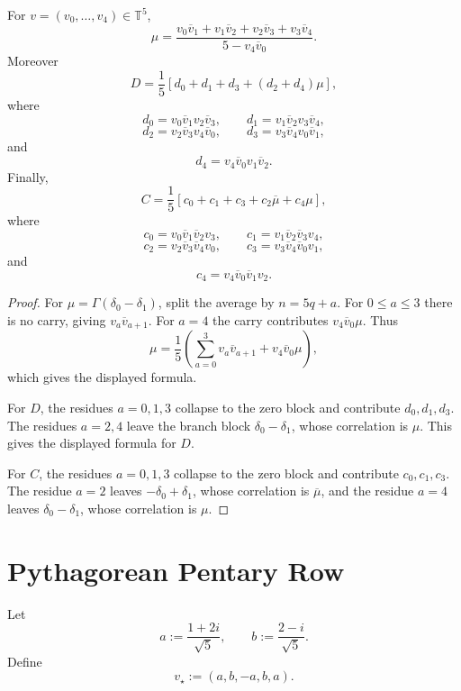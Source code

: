 \begin{theorem}[Pentary anchored $L=2$ formulas]
\label{thm:innovation-input-pentary-ltwo-formulas}
For $v=(v_0,\ldots,v_4)\in\mathbb T^5$,
$$
\mu
=
\frac{
v_0\overline v_1+
v_1\overline v_2+
v_2\overline v_3+
v_3\overline v_4
}{
5-v_4\overline v_0
}.
$$
Moreover
$$
D
=
\frac15
\left[
d_0+d_1+d_3+(d_2+d_4)\mu
\right],
$$
where
$$
d_0=v_0\overline v_1v_2\overline v_3,
\qquad
d_1=v_1\overline v_2v_3\overline v_4,
$$
$$
d_2=v_2\overline v_3v_4\overline v_0,
\qquad
d_3=v_3\overline v_4v_0\overline v_1,
$$
and
$$
d_4=v_4\overline v_0v_1\overline v_2.
$$
Finally,
$$
C
=
\frac15
\left[
c_0+c_1+c_3+c_2\overline\mu+c_4\mu
\right],
$$
where
$$
c_0=v_0\overline v_1\overline v_2v_3,
\qquad
c_1=v_1\overline v_2\overline v_3v_4,
$$
$$
c_2=v_2\overline v_3\overline v_4v_0,
\qquad
c_3=v_3\overline v_4\overline v_0v_1,
$$
and
$$
c_4=v_4\overline v_0\overline v_1v_2.
$$
\end{theorem}

\begin{proof}
For $\mu=\Gamma(\delta_0-\delta_1)$, split the average by $n=5q+a$.
For $0\le a\le3$ there is no carry, giving
$v_a\overline v_{a+1}$. For $a=4$ the carry contributes
$v_4\overline v_0\mu$. Thus
$$
\mu
=
\frac15
\left(
\sum_{a=0}^3v_a\overline v_{a+1}
+
v_4\overline v_0\mu
\right),
$$
which gives the displayed formula.

For $D$, the residues $a=0,1,3$ collapse to the zero block and contribute
$d_0,d_1,d_3$. The residues $a=2,4$ leave the branch block
$\delta_0-\delta_1$, whose correlation is $\mu$. This gives the displayed
formula for $D$.

For $C$, the residues $a=0,1,3$ collapse to the zero block and contribute
$c_0,c_1,c_3$. The residue $a=2$ leaves $-\delta_0+\delta_1$, whose
correlation is $\overline\mu$, and the residue $a=4$ leaves
$\delta_0-\delta_1$, whose correlation is $\mu$.
\end{proof}

\section{Pythagorean Pentary Row}
\label{sec:innovation-input-pythagorean-pentary-row}

\begin{definition}
\label{def:innovation-input-pythagorean-pentary-phase-word}
Let
$$
a:=\frac{1+2i}{\sqrt5},
\qquad
b:=\frac{2-i}{\sqrt5}.
$$
Define
$$
v_\star:=(a,b,-a,b,a).
$$
\end{definition}

